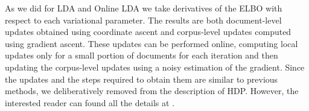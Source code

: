 As we did for LDA and Online LDA we take derivatives of the ELBO
with respect to each variational parameter.
The results are both document-level updates obtained using coordinate ascent
and corpus-level updates computed using gradient ascent.
These updates can be performed online,
computing local updates only for a small portion of documents
for each iteration and then updating the corpus-level updates using a noisy estimation
of the gradient.
Since the updates and the steps required to obtain them are similar to previous methods,
we deliberatively removed from the description of HDP. However, the interested reader can
found all the details at \cite{DBLP:journals/jmlr/WangPB11}.